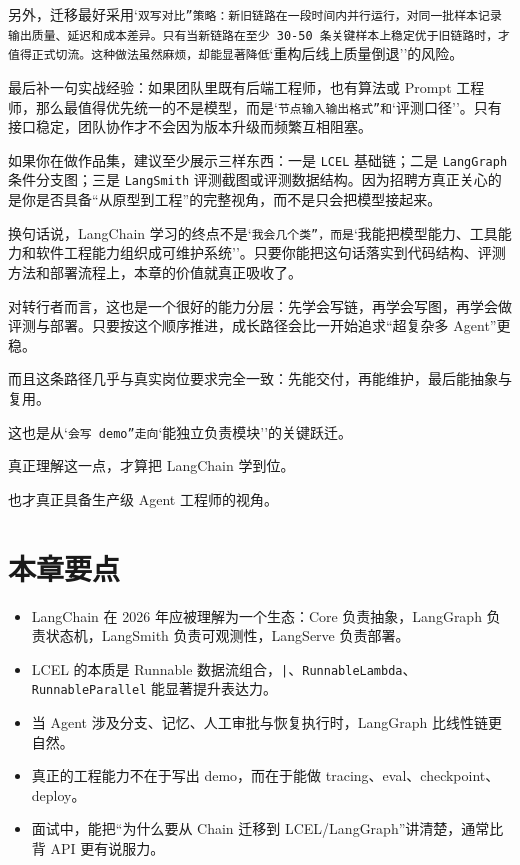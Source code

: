 另外，迁移最好采用`\texttt{双写对比''策略：新旧链路在一段时间内并行运行，对同一批样本记录输出质量、延迟和成本差异。只有当新链路在至少 30-50 条关键样本上稳定优于旧链路时，才值得正式切流。这种做法虽然麻烦，却能显著降低}`重构后线上质量倒退''的风险。


最后补一句实战经验：如果团队里既有后端工程师，也有算法或 Prompt 工程师，那么最值得优先统一的不是模型，而是`\texttt{节点输入输出格式''和}`评测口径''。只有接口稳定，团队协作才不会因为版本升级而频繁互相阻塞。


如果你在做作品集，建议至少展示三样东西：一是 \texttt{LCEL} 基础链；二是 \texttt{LangGraph} 条件分支图；三是 \texttt{LangSmith} 评测截图或评测数据结构。因为招聘方真正关心的是你是否具备``从原型到工程''的完整视角，而不是只会把模型接起来。


换句话说，LangChain 学习的终点不是`\texttt{我会几个类''，而是}`我能把模型能力、工具能力和软件工程能力组织成可维护系统''。只要你能把这句话落实到代码结构、评测方法和部署流程上，本章的价值就真正吸收了。


对转行者而言，这也是一个很好的能力分层：先学会写链，再学会写图，再学会做评测与部署。只要按这个顺序推进，成长路径会比一开始追求``超复杂多 Agent''更稳。


而且这条路径几乎与真实岗位要求完全一致：先能交付，再能维护，最后能抽象与复用。


这也是从`\texttt{会写 demo''走向}`能独立负责模块''的关键跃迁。


真正理解这一点，才算把 LangChain 学到位。


也才真正具备生产级 Agent 工程师的视角。


\section{本章要点}

\begin{itemize}[leftmargin=2em]
\item LangChain 在 2026 年应被理解为一个生态：Core 负责抽象，LangGraph 负责状态机，LangSmith 负责可观测性，LangServe 负责部署。
\item LCEL 的本质是 Runnable 数据流组合，\texttt{|}、\texttt{RunnableLambda}、\texttt{RunnableParallel} 能显著提升表达力。
\item 当 Agent 涉及分支、记忆、人工审批与恢复执行时，LangGraph 比线性链更自然。
\item 真正的工程能力不在于写出 demo，而在于能做 tracing、eval、checkpoint、deploy。
\item 面试中，能把``为什么要从 Chain 迁移到 LCEL/LangGraph''讲清楚，通常比背 API 更有说服力。
\end{itemize}

